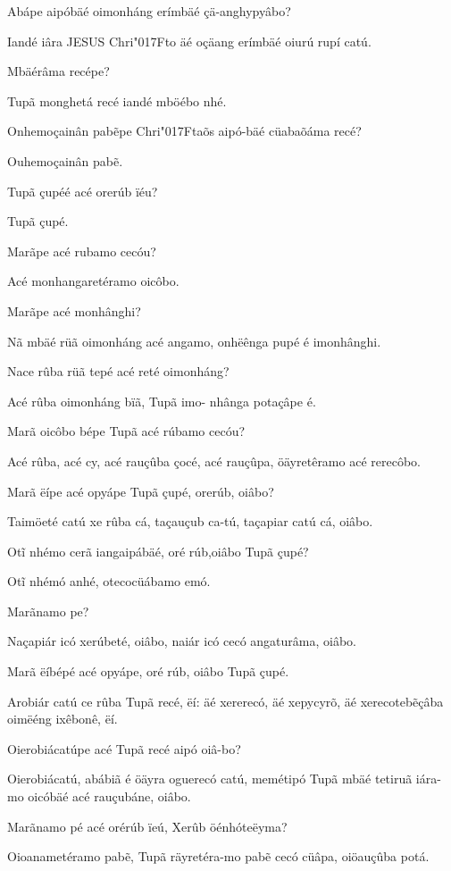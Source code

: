 \documentclass[openany,titlepage,12pt]{book}
\newcommand{\lgS}{\char"017F}
\begin{document}
\begin{alternate}
    \item Abápe aipóbäé oimonháng erímbäé 
    çä-anghypyâbo?
    \item Iandé iâra JESUS Chri\lgS to äé oçäang\linebreak
    erímbäé oiurú rupí catú.
    \item Mbäérâma recépe?
    \item Tupã monghetá recé iandé mböébo nhé.
    \item Onhemoçainân pabẽpe Chri\lgS taõs aipó-bäé
    cüabaõáma recé?
    \item Ouhemoçainân pabẽ.
    \item Tupã çupéé acé orerúb ïéu?
    \item Tupã çupé.
    \item Marãpe acé rubamo cecóu?
    \item Acé monhangaretéramo oicôbo.
    \item Marãpe acé monhânghi?
    \item Nã mbäé rüã oimonháng acé angamo,
    onhëênga pupé é imonhânghi.
    \item Nace rûba rüã tepé acé reté oimonháng?
    \item Acé rûba oimonháng bïã, Tupã imo-\linebreak
    nhânga potaçâpe é.
    \item Marã oicôbo bépe Tupã acé rúbamo cecóu?
    \item Acé rûba, acé cy, acé rauçûba çocé, acé rauçûpa,
    öäyretêramo acé rerecôbo.
    \item Marã ëípe acé opyápe Tupã çupé, orerúb, oiâbo?
    \item Taimöeté catú xe rûba cá, taçauçub ca-tú,
    taçapiar catú cá, oiâbo.
    \item Otĩ nhémo cerã iangaipábäé, oré rúb,\linebreak oiâbo
    Tupã çupé?
    \item Otĩ nhémó anhé, otecocüábamo emó.
    \item Marãnamo pe?
    \item Naçapiár icó xerúbeté, oiâbo, naiár icó
    cecó angaturâma, oiâbo.
    \item Marã ëíbépé acé opyápe, oré rúb, oiâbo Tupã çupé.
    \item Arobiár catú ce rûba Tupã recé, ëí: äé xererecó,
    äé xepycyrõ, äé xerecotebẽçâba oimëéng ixêbonê, ëí.
    \item Oierobiácatúpe acé Tupã recé aipó oiâ-bo?
    \item Oierobiácatú, abábiã é öäyra oguerecó catú,
    memétipó Tupã mbäé tetiruã iára-mo oicóbäé acé rauçubáne,
    oiâbo.
    \item Marãnamo pé acé orérúb ïeú, Xerûb öénhóteëyma?
    \item Oioanametéramo pabẽ, Tupã räyretéra-mo pabẽ cecó
    cüâpa, oiöauçûba potá.
\end{alternate}
\end{document}
